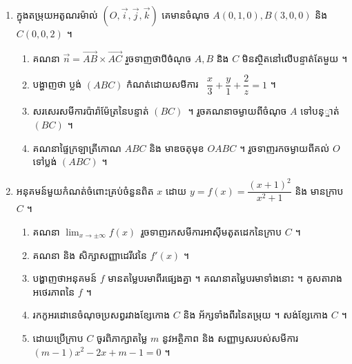 \documentclass[12pt ,a4paper]{book}
\newcommand{\df}{\dfrac}
\renewcommand{\(}{\left(}
\renewcommand{\)}{\right)}
\renewcommand{\[}{\left[}
\renewcommand{\]}{\right]}
\begin{document}
\begin{enumerate}
\begin{enumerate}
\end{enumerate}

\item  ក្នុងតម្រុយអតូណរម៉ាល់ $\(O, \vec i,\vec j , \vec k\)$  គេមានចំណុច $A(0,1,0),B(3,0,0)$ និង $C(0,0,2)$  ។

\begin{enumerate}

\item    គណនា $\vec n=\overrightarrow{AB}\times \overrightarrow{AC}$   រួចទាញថាបីចំណុច $A,B$ និង $C$ មិនស្ថិតនៅលើបន្ទាត់តែមួយ ។

\item  បង្ហាញថា ប្លង់ $(ABC)$  កំណត់ដោយសមីការ ~$\df x3+\df y1+\df 2z=1$ ។

\item  សរសេរសមីការប៉ារ៉ាម៉ែត្រនៃបន្ទាត់  $(BC)$~។ រួចគណនាចម្ងាយពីចំណុច 	$A$ ទៅបន្្ទាត់ $(BC)$  ។

\item  គណនាផ្ទៃក្រឡាត្រីកោណ $ABC$  និង មាឌចតុមុខ $OABC$  ។ រួចទាញរកចម្ងាយពីគល់  $O$  ទៅប្លង់ $(ABC)$ ។

\end{enumerate}

\item  អនុគមន៍មួយកំណត់ចំពោះគ្រប់ចំនួនពិត $x$ ដោយ $y=f(x)=\df{(x+1)^2}{x^2+1}$ និង មានក្រាប $C$ ។

\begin{enumerate}

\item   គណនា $\lim_{x\to \pm \infty}f(x)$~រួចទាញរកសមីការអាស៊ីមតូតដេកនៃក្រាប $C$ ។

\item    គណនា និង សិក្សាសញ្ញាដេរីវេនៃ $f'(x)$ ។

\item   បង្ហាញថាអនុគមន៍ $f$  មានតម្លៃបរមាពីរផ្សេងគ្នា ។  គណនាតម្លៃបរមាទាំងនោះ ។ គូសតារាងអថេរភាពនៃ $f$ ។

\item   រកកូអរដោនេចំណុចប្រសព្វរវាងខ្សែកោង $C$  និង អ័ក្សទាំងពីរនៃតម្រុយ  ។ សង់ខ្សែកោង $C$ ។

\item   ដោយប្រើក្រាប $C$  ចូរពិភាក្សាតម្លៃ $m$ នូវអត្ថិភាព  និង សញ្ញាឫសរបស់សមីការ  $(m-1)x^2-2x+m-1=0$  ។

\end{enumerate}

\end{enumerate}
\end{document}
